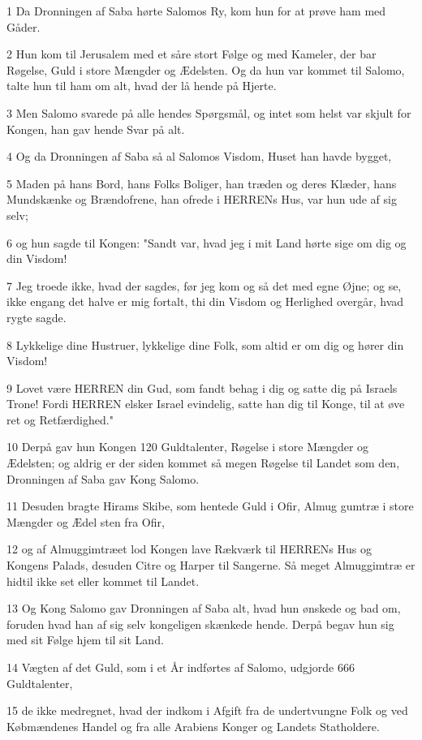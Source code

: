 \par 1 Da Dronningen af Saba hørte Salomos Ry, kom hun for at prøve ham med Gåder.
\par 2 Hun kom til Jerusalem med et såre stort Følge og med Kameler, der bar Røgelse, Guld i store Mængder og Ædelsten. Og da hun var kommet til Salomo, talte hun til ham om alt, hvad der lå hende på Hjerte.
\par 3 Men Salomo svarede på alle hendes Spørgsmål, og intet som helst var skjult for Kongen, han gav hende Svar på alt.
\par 4 Og da Dronningen af Saba så al Salomos Visdom, Huset han havde bygget,
\par 5 Maden på hans Bord, hans Folks Boliger, han træden og deres Klæder, hans Mundskænke og Brændofrene, han ofrede i HERRENs Hus, var hun ude af sig selv;
\par 6 og hun sagde til Kongen: "Sandt var, hvad jeg i mit Land hørte sige om dig og din Visdom!
\par 7 Jeg troede ikke, hvad der sagdes, før jeg kom og så det med egne Øjne; og se, ikke engang det halve er mig fortalt, thi din Visdom og Herlighed overgår, hvad rygte sagde.
\par 8 Lykkelige dine Hustruer, lykkelige dine Folk, som altid er om dig og hører din Visdom!
\par 9 Lovet være HERREN din Gud, som fandt behag i dig og satte dig på Israels Trone! Fordi HERREN elsker Israel evindelig, satte han dig til Konge, til at øve ret og Retfærdighed."
\par 10 Derpå gav hun Kongen 120 Guldtalenter, Røgelse i store Mængder og Ædelsten; og aldrig er der siden kommet så megen Røgelse til Landet som den, Dronningen af Saba gav Kong Salomo.
\par 11 Desuden bragte Hirams Skibe, som hentede Guld i Ofir, Almug gumtræ i store Mængder og Ædel sten fra Ofir,
\par 12 og af Almuggimtræet lod Kongen lave Rækværk til HERRENs Hus og Kongens Palads, desuden Citre og Harper til Sangerne. Så meget Almuggimtræ er hidtil ikke set eller kommet til Landet.
\par 13 Og Kong Salomo gav Dronningen af Saba alt, hvad hun ønskede og bad om, foruden hvad han af sig selv kongeligen skænkede hende. Derpå begav hun sig med sit Følge hjem til sit Land.
\par 14 Vægten af det Guld, som i et År indførtes af Salomo, udgjorde 666 Guldtalenter,
\par 15 de ikke medregnet, hvad der indkom i Afgift fra de undertvungne Folk og ved Købmændenes Handel og fra alle Arabiens Konger og Landets Statholdere.

